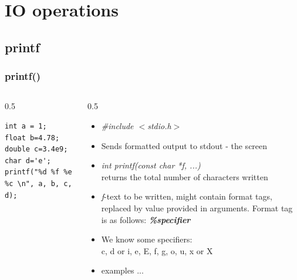 \documentclass[10pt]{beamer}
\begin{document}
\section{IO operations}
\subsection{printf}

\begin{frame}[fragile]
  \frametitle{printf()}
  \begin{columns}
    \begin{column}{0.5\textwidth}
\begin{lstlisting}
int a = 1;
float b=4.78;
double c=3.4e9;
char d='e';
printf("%d %f %e %c \n", a, b, c, d);
\end{lstlisting}
    \end{column}
    \begin{column}{0.5\textwidth}
      \begin{itemize}
        \item \textit{\#include $<$stdio.h$>$}
        \item Sends formatted output to stdout - the screen
        \item \textit{int printf(const char *f, ...)}\\
        returns the total number of characters written
        \item \textit{f}-text to be written, might contain format tags, replaced by value provided in arguments. Format tag is as follows: \textit{\textbf{\%specifier}}
        \item We know some specifiers:\\
        c, d or i, e, E, f, g, o, u, x or X
        \item examples ...
      \end{itemize}
    \end{column}
  \end{columns}
\end{frame}
\end{document}

